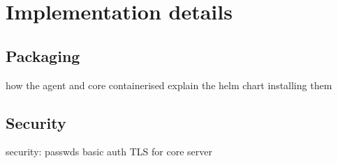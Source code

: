 \setlength{\parindent}{0pt}
\setlength{\parskip}{0.6em}

\chapter[Implementation]{Implementation details}
\label{chap:implementation}








\section{Packaging}
how the agent and core containerised
explain the helm chart installing them



\section{Security}
security:
    passwds
        basic auth
    TLS for core server 




